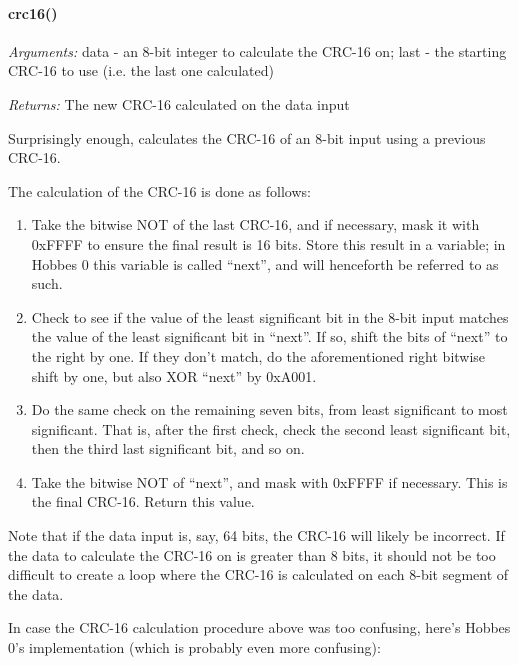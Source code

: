 \documentclass[12pt,letterpaper]{article}
\begin{document}
\setcounter{paragraph}{-1}



%
%
\paragraph{crc16()}
\label{4.3.1.0}

\emph{Arguments:} data - an 8-bit integer to calculate the CRC-16 on; last - the starting CRC-16 to use (i.e. the last one calculated)

\emph{Returns:} The new CRC-16 calculated on the data input

Surprisingly enough, calculates the CRC-16 of an 8-bit input using a previous CRC-16.

The calculation of the CRC-16 is done as follows:

\begin{enumerate}

\item Take the bitwise NOT of the last CRC-16, and if necessary, mask it with 0xFFFF to ensure the final result is 16 bits. Store this result in a variable; in Hobbes 0 this variable is called ``next'', and will henceforth be referred to as such.

\item Check to see if the value of the least significant bit in the 8-bit input matches the value of the least significant bit in ``next''. If so, shift the bits of ``next'' to the right by one. If they don't match, do the aforementioned right bitwise shift by one, but also XOR ``next'' by 0xA001.

\item Do the same check on the remaining seven bits, from least significant to most significant. That is, after the first check, check the second least significant bit, then the third last significant bit, and so on.

\item Take the bitwise NOT of ``next'', and mask with 0xFFFF if necessary. This is the final CRC-16. Return this value.

\end{enumerate}

Note that if the data input is, say, 64 bits, the CRC-16 will likely be incorrect. If the data to calculate the CRC-16 on is greater than 8 bits, it should not be too difficult to create a loop where the CRC-16 is calculated on each 8-bit segment of the data.

In case the CRC-16 calculation procedure above was too confusing, here's Hobbes 0's implementation (which is probably even more confusing):
\end{document}

